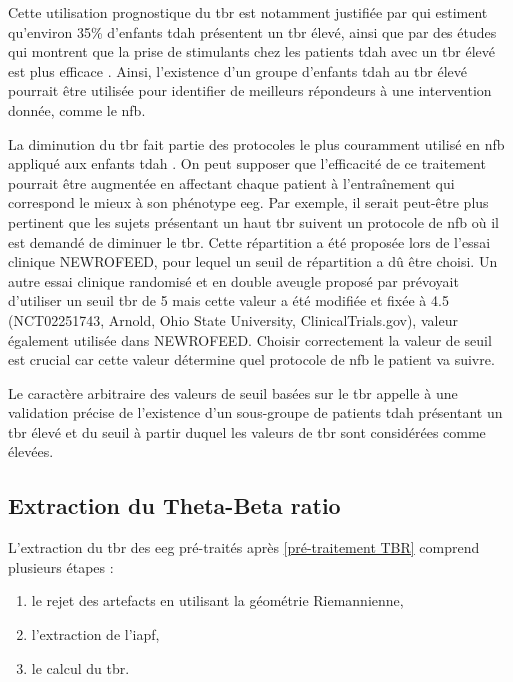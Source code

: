 Cette utilisation prognostique du \gls{tbr} est notamment justifiée par \citet{Clarke2011} qui estiment qu'environ 35\% d'enfants \gls{tdah} présentent un \gls{tbr} élevé, ainsi que 
par des études qui montrent que la prise de stimulants chez les patients \gls{tdah} avec un \gls{tbr} élevé est plus efficace \citep{Arns2012med, Clarke2002}. 
Ainsi, l'existence d'un groupe d'enfants \gls{tdah} au \gls{tbr} élevé pourrait être utilisée pour identifier de meilleurs répondeurs à une intervention donnée, comme le \gls{nfb}. 

La diminution du \gls{tbr} fait partie des protocoles le plus couramment utilisé en \gls{nfb} appliqué aux enfants \gls{tdah} \citep{Arns2014}. 
On peut supposer que l'efficacité de ce traitement pourrait être augmentée en affectant chaque patient à l'entraînement qui correspond le mieux à son phénotype \gls{eeg}. 
Par exemple, il serait peut-être plus pertinent que les sujets présentant un haut \gls{tbr} suivent un protocole de \gls{nfb} où il est demandé de 
diminuer le \gls{tbr}. Cette répartition a été proposée lors de l'essai clinique NEWROFEED, pour lequel un seuil de répartition a dû être choisi. 
Un autre essai clinique randomisé et en double aveugle proposé par \citet{Kerson2013} prévoyait d'utiliser un seuil \gls{tbr} de 5 mais cette valeur a 
été modifiée et fixée à 4.5 (NCT02251743, Arnold, Ohio State University, ClinicalTrials.gov), valeur également
utilisée dans NEWROFEED. Choisir correctement la valeur de seuil est crucial car cette valeur détermine quel protocole de \gls{nfb} le patient va suivre. 

Le caractère arbitraire des valeurs de seuil basées sur le \gls{tbr} appelle à une validation précise de l'existence d'un 
sous-groupe de patients \gls{tdah} présentant un \gls{tbr} élevé et du seuil à partir duquel les valeurs de \gls{tbr} sont considérées comme élevées.  
 
\subsection{Extraction du Theta-Beta ratio} \label{extraction_tbr}
L'extraction du \gls{tbr} des \gls{eeg} pré-traités après \ref{pré-traitement TBR} comprend plusieurs étapes :
\begin{enumerate}
\item le rejet des artefacts en utilisant la géométrie Riemannienne,
\item l'extraction de l'\gls{iapf},
\item le calcul du \gls{tbr}.
\end{enumerate}

